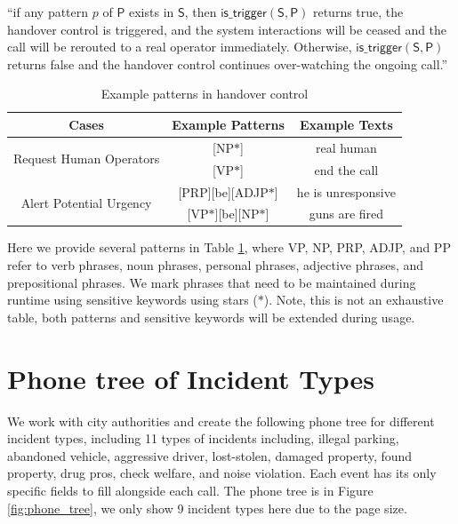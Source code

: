 ``if any pattern $p$ of $\mathsf{P}$ exists in $\mathsf{S}$, then $\mathsf{is\_trigger(S, {P})}$ returns true, the handover control is triggered, and the system interactions will be ceased and the call will be rerouted to a real operator immediately. Otherwise, $\mathsf{is\_trigger(S, {P})}$ returns false and the handover control continues over-watching the ongoing call.'' 

\begin{table}[h]
\centering
\scriptsize
\caption{Example patterns in handover control}
\begin{tabular}{||c|c|c||}
\hline
Cases                                       & Example Patterns             & Example Texts      \\ \hline\hline
\multirow{2}{*}{Request Human Operators} & {[}NP$\ast${]}                    & real human         \\ \cline{2-3} 
                                            & {[}VP$\ast${]}                    & end the call       \\ \hline
\multirow{2}{*}{Alert Potential Urgency} & {[}PRP{]}{[}be{]}{[}ADJP$\ast${]} & he is unresponsive \\ \cline{2-3} 
                                            & {[}VP$\ast${]}{[}be{]}{[}NP$\ast${]}   & guns are fired     \\ \hline
\end{tabular}
\label{tab:patterns}
\end{table}

Here we provide several patterns in Table \ref{tab:patterns}, where VP, NP, PRP, ADJP, and PP refer to verb phrases, noun phrases, personal phrases, adjective phrases, and prepositional phrases. We mark phrases that need to be maintained during runtime using sensitive keywords using stars ($\ast$). Note, this is not an exhaustive table, both patterns and sensitive keywords will be extended during usage.




\section{Phone tree of Incident Types}
We work with city authorities and create the following phone tree for different incident types, including 11 types of incidents including, illegal parking, abandoned vehicle, aggressive driver, lost-stolen, damaged property, found property, drug pros, check welfare, and noise violation. Each event has its only specific fields to fill alongside each call. The phone tree is in Figure \ref{fig:phone_tree}, we only show 9 incident types here due to the page size.



